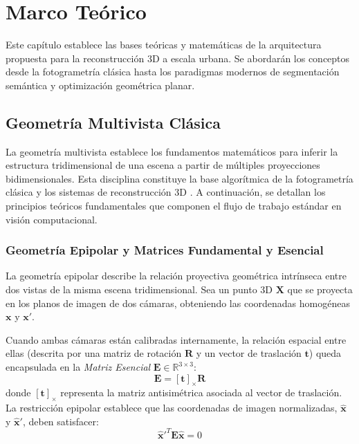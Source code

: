 \chapter{Marco Teórico}

Este capítulo establece las bases teóricas y matemáticas de la arquitectura propuesta para la reconstrucción 3D a escala urbana. Se abordarán los conceptos desde la fotogrametría clásica hasta los paradigmas modernos de segmentación semántica y optimización geométrica planar.

\section{Geometría Multivista Clásica}

La geometría multivista establece los fundamentos matemáticos para inferir la estructura tridimensional de una escena a partir de múltiples proyecciones bidimensionales. Esta disciplina constituye la base algorítmica de la fotogrametría clásica y los sistemas de reconstrucción 3D \cite{hartley2003multiple}. A continuación, se detallan los principios teóricos fundamentales que componen el flujo de trabajo estándar en visión computacional.

\subsection{Geometría Epipolar y Matrices Fundamental y Esencial}

La geometría epipolar describe la relación proyectiva geométrica intrínseca entre dos vistas de la misma escena tridimensional. Sea un punto 3D $\mathbf{X}$ que se proyecta en los planos de imagen de dos cámaras, obteniendo las coordenadas homogéneas $\mathbf{x}$ y $\mathbf{x}'$.

Cuando ambas cámaras están calibradas internamente, la relación espacial entre ellas (descrita por una matriz de rotación $\mathbf{R}$ y un vector de traslación $\mathbf{t}$) queda encapsulada en la \textit{Matriz Esencial} $\mathbf{E} \in \mathbb{R}^{3 \times 3}$:
\begin{equation}
    \mathbf{E} = [\mathbf{t}]_{\times} \mathbf{R}
\end{equation}
donde $[\mathbf{t}]_{\times}$ representa la matriz antisimétrica asociada al vector de traslación. La restricción epipolar establece que las coordenadas de imagen normalizadas, $\mathbf{\hat{x}}$ y $\mathbf{\hat{x}}'$, deben satisfacer:
\begin{equation}
    \mathbf{\hat{x}}'^T \mathbf{E} \mathbf{\hat{x}} = 0
\end{equation}

